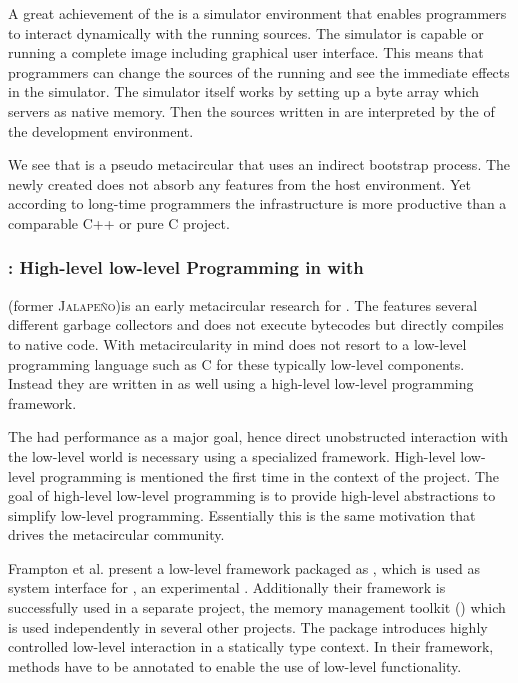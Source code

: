 A great achievement of the \Squeak \VM is a simulator environment that enables programmers to interact dynamically with the running \VM sources.
The simulator is capable or running a complete \Squeak \ST image including graphical user interface.
This means that programmers can change the sources of the running \VM and see the immediate effects in the simulator.
The simulator itself works by setting up a byte array which servers as native memory.
Then the \VM sources written in \Slang are interpreted by the \VM of the development environment.

We see that \Squeak is a pseudo metacircular \VM that uses an indirect bootstrap process.
The newly created \VM does not absorb any features from the host environment.
Yet according to long-time \VM programmers the \Squeak infrastructure is more productive than a comparable C++ or pure C project.

\subsubsection*{\Jikes: High-level low-level Programming in with \MMTK}
\Jikes (former \textsc{Jalapeño})is an early metacircular research \VM for \Java \cite{Alpe00a}.
The \Jikes \VM features several different garbage collectors and does not execute bytecodes but directly compiles to native code.
With metacircularity in mind \Jikes does not resort to a low-level programming language such as C for these typically low-level \VM components.
Instead they are written in \Java as well using a high-level low-level programming framework.

The \Jikes \VM had performance as a major goal, hence direct unobstructed interaction with the low-level world is necessary using a specialized framework.
High-level low-level programming \cite{Fram09a} is mentioned the first time in the context of the \Jikes \VM project.
The goal of high-level low-level programming is to provide high-level abstractions to simplify low-level programming.
Essentially this is the same motivation that drives the metacircular \VM community.

Frampton et al. present a low-level framework packaged as , which is used as system interface for \Jikes, an experimental \Java \VM.
Additionally their framework is successfully used in a separate project, the memory management toolkit (\MMTK) \cite{Blac04a} which is used independently in several other projects.
The  package introduces highly controlled low-level interaction in a statically type context.
In their framework, methods have to be annotated to enable the use of low-level functionality.

